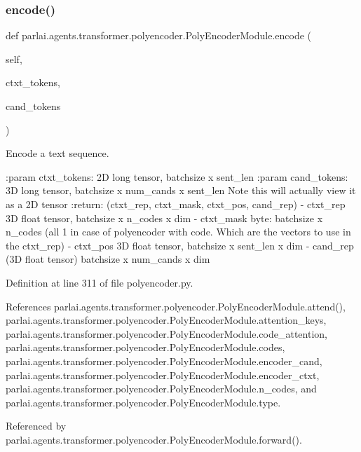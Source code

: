 \subsubsection{\texorpdfstring{encode()}{encode()}}
{\footnotesize\ttfamily def parlai.\+agents.\+transformer.\+polyencoder.\+Poly\+Encoder\+Module.\+encode (\begin{DoxyParamCaption}\item[{}]{self,  }\item[{}]{ctxt\+\_\+tokens,  }\item[{}]{cand\+\_\+tokens }\end{DoxyParamCaption})}

\begin{DoxyVerb}Encode a text sequence.

:param ctxt_tokens:
    2D long tensor, batchsize x sent_len
:param cand_tokens:
    3D long tensor, batchsize x num_cands x sent_len
    Note this will actually view it as a 2D tensor
:return:
    (ctxt_rep, ctxt_mask, ctxt_pos, cand_rep)
    - ctxt_rep 3D float tensor, batchsize x n_codes x dim
    - ctxt_mask byte:  batchsize x n_codes (all 1 in case
    of polyencoder with code. Which are the vectors to use
    in the ctxt_rep)
    - ctxt_pos 3D float tensor, batchsize x sent_len x dim
    - cand_rep (3D float tensor) batchsize x num_cands x dim
\end{DoxyVerb}
 

Definition at line 311 of file polyencoder.\+py.



References parlai.\+agents.\+transformer.\+polyencoder.\+Poly\+Encoder\+Module.\+attend(), parlai.\+agents.\+transformer.\+polyencoder.\+Poly\+Encoder\+Module.\+attention\+\_\+keys, parlai.\+agents.\+transformer.\+polyencoder.\+Poly\+Encoder\+Module.\+code\+\_\+attention, parlai.\+agents.\+transformer.\+polyencoder.\+Poly\+Encoder\+Module.\+codes, parlai.\+agents.\+transformer.\+polyencoder.\+Poly\+Encoder\+Module.\+encoder\+\_\+cand, parlai.\+agents.\+transformer.\+polyencoder.\+Poly\+Encoder\+Module.\+encoder\+\_\+ctxt, parlai.\+agents.\+transformer.\+polyencoder.\+Poly\+Encoder\+Module.\+n\+\_\+codes, and parlai.\+agents.\+transformer.\+polyencoder.\+Poly\+Encoder\+Module.\+type.



Referenced by parlai.\+agents.\+transformer.\+polyencoder.\+Poly\+Encoder\+Module.\+forward().


